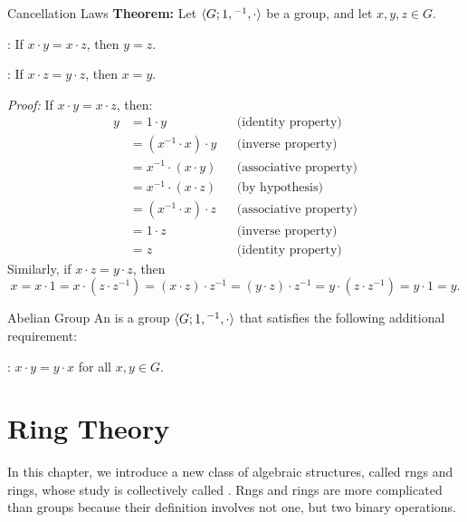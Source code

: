 \documentclass[12pt]{report}
\begin{document}
\begin{thmbox}{Cancellation Laws}
	\textbf{Theorem:} Let ${\langle {G; 1, {}^{-1}, \cdot} \rangle}$ be a group, and let $x, y, z \in G$.
	\begin{boxitems}
		\item {}: If $x \cdot y = x \cdot z$, then $y = z$.
		\item {}: If $x \cdot z = y \cdot z$, then $x = y$.
	\end{boxitems}
\tcblower
	\textit{Proof:} If $x \cdot y = x \cdot z$, then:
	\begin{align*}
		y & = 1 \cdot y                &  & \text{(identity property)}    \\
		  & = (x^{-1} \cdot x) \cdot y &  & \text{(inverse property)}     \\
		  & = x^{-1} \cdot (x \cdot y) &  & \text{(associative property)} \\
		  & = x^{-1} \cdot (x \cdot z) &  & \text{(by hypothesis)}        \\
		  & = (x^{-1} \cdot x) \cdot z &  & \text{(associative property)} \\
		  & = 1 \cdot z                &  & \text{(inverse property)}     \\
		  & = z                        &  & \text{(identity property)}
	\end{align*}
	Similarly, if $x \cdot z = y \cdot z$, then
	\[ x = x \cdot 1 = x \cdot (z \cdot z^{-1}) = (x \cdot z) \cdot z^{-1} = (y \cdot z) \cdot z^{-1} = y \cdot (z \cdot z^{-1}) = y \cdot 1 = y. \]
\end{thmbox}

\begin{dfnbox}{Abelian Group}
	An  is a group ${\langle {G; 1, {}^{-1}, \cdot} \rangle}$ that satisfies the following additional requirement:
	\begin{boxitems}
		\item {}: $x \cdot y = y \cdot x$ for all $x, y \in G$.
	\end{boxitems}
\end{dfnbox}



\chapter{Ring Theory}

In this chapter, we introduce a new class of algebraic structures, called rngs and rings, whose study is collectively called . Rngs and rings are more complicated than groups because their definition involves not one, but two binary operations.
\end{document}
